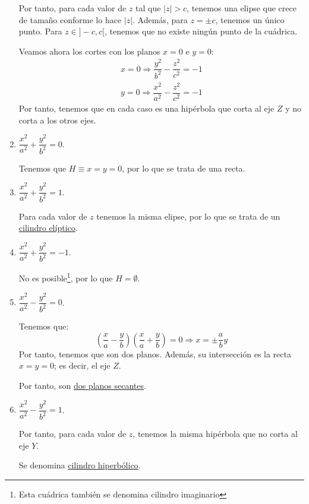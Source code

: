 \begin{enumerate}
    Por tanto, para cada valor de $z$ tal que $|z|>c$, tenemos una elipse que crece de tamaño conforme lo hace $|z|$. Además, para $z=\pm c$, tenemos un único punto. Para $z\in ]-c,c[$, tenemos que no existe ningún punto de la cuádrica.

    Veamos ahora los cortes con los planos $x=0$ e $y=0$:
    \begin{gather*}
        x = 0 \Longrightarrow \dfrac{y^2}{b^2} - \dfrac{z^2}{c^2} = -1 \\
        y = 0 \Longrightarrow \dfrac{x^2}{a^2} - \dfrac{z^2}{c^2} = -1
    \end{gather*}
    Por tanto, tenemos que en cada caso es una hipérbola que corta al eje $Z$ y no corta a los otros ejes.

    
    \item $\dfrac{x^2}{a^2} + \dfrac{y^2}{b^2} = 0$.

    Tenemos que $H\equiv x=y=0$, por lo que se trata de una recta.
    
    \item $\dfrac{x^2}{a^2} + \dfrac{y^2}{b^2} = 1$.

    Para cada valor de $z$ tenemos la misma elipse, por lo que se trata de un \ul{cilindro elíptico}.
    
    \item $\dfrac{x^2}{a^2} + \dfrac{y^2}{b^2} = -1$.

    No es posible\footnote{Esta cuádrica también se denomina cilindro imaginario}, por lo que $H=\emptyset$.
    
    \item $\dfrac{x^2}{a^2} - \dfrac{y^2}{b^2} = 0$.

    Tenemos que:
    \begin{equation*}
        \left(\dfrac{x}{a} - \dfrac{y}{b}\right)\left(\dfrac{x}{a} + \dfrac{y}{b}\right) = 0 \Longrightarrow x = \pm \frac{a}{b}y
    \end{equation*}
    Por tanto, tenemos que son dos planos. Además, su intersección es la recta $x=y=0$; es decir, el eje $Z$.

    Por tanto, son \ul{dos planos secantes}.

    
    \item $\dfrac{x^2}{a^2} - \dfrac{y^2}{b^2} = 1$.

    Por tanto, para cada valor de $z$, tenemos la misma hipérbola que no corta al eje $Y$.

    Se denomina \ul{cilindro hiperbólico}.
    

\end{enumerate}
